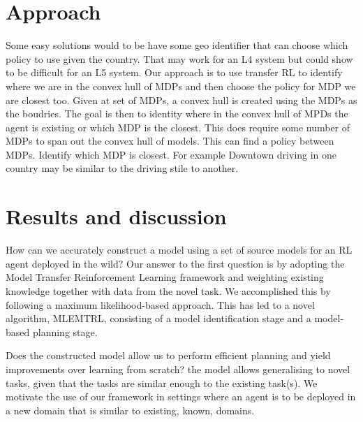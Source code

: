 \section{Approach}
Some easy solutions would to be have some geo identifier that can choose which policy to use given the country. That may work for an L4 system but could show to be difficult for an L5 system. Our approach is to use transfer RL to identify where we are in the convex hull of MDPs and then choose the policy for MDP we are closest too. 
Given at set of MDPs, a convex hull is created using the MDPs as the boudries. The goal is then to identity where in the convex hull of MPDs the agent is existing or which MDP is the closest. 
This does require some number of MDPs to span out the convex hull of models. 
This can find a policy between MDPs. 
Identify which MDP is closest. For example Downtown driving in one country may be similar to the driving stile to another. 


\section{Results and discussion}
How can we accurately construct a model using a set of source models
for an RL agent deployed in the wild?
Our answer to the first question is by adopting the Model Transfer Reinforcement Learning framework and weighting existing knowledge together with data from the novel task. We accomplished this by following a maximum likelihood-based approach. This has led to a novel algorithm, MLEMTRL, consisting of a model identification stage and a model-based planning stage.

Does the constructed model allow us to perform efficient planning and yield improvements over learning from scratch? 
the model allows generalising to novel tasks, given that the tasks are similar enough to the existing task(s).
We motivate the use of our framework in settings where an agent is to be deployed in a new domain that is similar to existing, known, domains.
